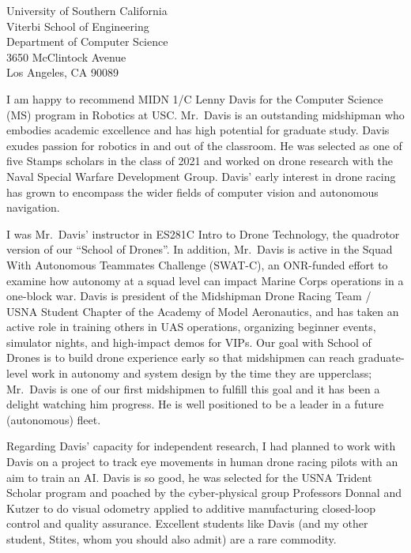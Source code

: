 \documentclass[10pt]{wrceletter}
\date{\today}
\begin{document}
\begin{letter}{%
University of Southern California\\
Viterbi School of Engineering\\
Department of Computer Science\\
3650 McClintock Avenue\\
Los Angeles, CA 90089}

\opening{}
\raggedright %
\setlength{\parindent}{15pt} %

I am happy to recommend MIDN 1/C Lenny Davis for the Computer Science (MS) program in Robotics at USC.  Mr.~Davis is an outstanding midshipman who embodies academic excellence and has high potential for graduate study. Davis exudes passion for robotics in and out of the classroom. He was selected as one of five Stamps scholars in the class of 2021 and worked on drone research with the Naval Special Warfare Development Group. Davis' early interest in drone racing has grown to encompass the wider fields of computer vision and autonomous navigation.  

I was Mr.~Davis’ instructor in ES281C Intro to Drone Technology, the quadrotor version of our ``School of Drones''. In addition, Mr.~Davis is active in the Squad With Autonomous Teammates Challenge (SWAT-C), an ONR-funded effort to examine how autonomy at a squad level can impact Marine Corps operations in a one-block war. Davis is president of the Midshipman Drone Racing Team / USNA Student Chapter of the Academy of Model Aeronautics, and has taken an active role in training others in UAS operations, organizing beginner events, simulator nights, and high-impact demos for VIPs.  Our goal with School of Drones is to build drone experience early so that midshipmen can reach graduate-level work in autonomy and system design by the time they are upperclass; Mr.~Davis is one of our first midshipmen to fulfill this goal and it has been a delight watching him progress. He is well positioned to be a leader in a future (autonomous) fleet. 

Regarding Davis' capacity for independent research, I had planned to work with Davis on a project to track eye movements in human drone racing pilots with an aim to train an AI.  Davis is so good, he was selected for the USNA Trident Scholar program and poached by the cyber-physical group Professors Donnal and Kutzer to do visual odometry applied to additive manufacturing closed-loop control and quality assurance. Excellent students like Davis (and my other student, Stites, whom you should also admit) are a rare commodity.


\end{letter}
\end{document}
